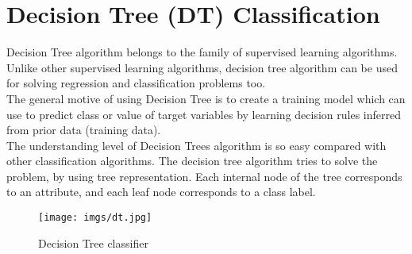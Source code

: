 \documentclass[document.tex]{subfiles}
\begin{document}
\section{Decision Tree (DT) Classification}
Decision Tree algorithm belongs to the family of supervised learning algorithms. Unlike other supervised learning algorithms, decision tree algorithm can be used for solving regression and classification problems too.\\
The general motive of using Decision Tree is to create a training model which can use to predict class or value of target variables by learning decision rules inferred from prior data (training data).\\
The understanding level of Decision Trees algorithm is so easy compared with other classification algorithms. The decision tree algorithm tries to solve the problem, by using tree representation. Each internal node of the tree corresponds to an attribute, and each leaf node corresponds to a class label.\\
\begin{figure}[H]
	\centering
	\texttt{[image: imgs/dt.jpg]}
	\caption[Decision Tree classifier\cite{a37}]
	{Decision Tree classifier\cite{a37}}
\end{figure}
\end{document}
